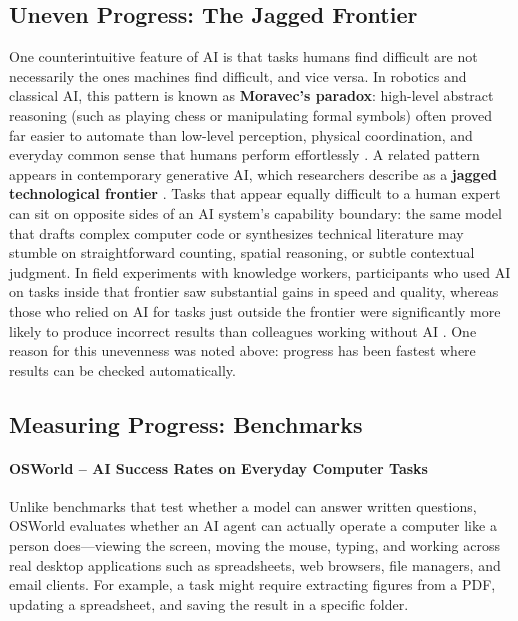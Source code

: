 \documentclass[11pt]{article}
\begin{document}
\subsection{Uneven Progress: The Jagged Frontier}

One counterintuitive feature of AI is that tasks humans find difficult are not necessarily the ones machines find difficult, and vice versa. In robotics and classical AI, this pattern is known as \textbf{Moravec's paradox}: high-level abstract reasoning (such as playing chess or manipulating formal symbols) often proved far easier to automate than low-level perception, physical coordination, and everyday common sense that humans perform effortlessly \citep{Moravec1988MindChildren}. A related pattern appears in contemporary generative AI, which researchers describe as a \textbf{jagged technological frontier} \citep{DellAcqua2026JaggedFrontier}. Tasks that appear equally difficult to a human expert can sit on opposite sides of an AI system's capability boundary: the same model that drafts complex computer code or synthesizes technical literature may stumble on straightforward counting, spatial reasoning, or subtle contextual judgment. In field experiments with knowledge workers, participants who used AI on tasks inside that frontier saw substantial gains in speed and quality, whereas those who relied on AI for tasks just outside the frontier were significantly more likely to produce incorrect results than colleagues working without AI \citep{DellAcqua2026JaggedFrontier}.
One reason for this unevenness was noted above: progress has been fastest where results can be checked automatically.

\subsection{Measuring Progress: Benchmarks}

\paragraph{OSWorld -- AI Success Rates on Everyday Computer Tasks}

Unlike benchmarks that test whether a model can answer written questions, OSWorld evaluates whether an AI agent can actually operate a computer like a person does---viewing the screen, moving the mouse, typing, and working across real desktop applications such as spreadsheets, web browsers, file managers, and email clients. For example, a task might require extracting figures from a PDF, updating a spreadsheet, and saving the result in a specific folder.
\end{document}
